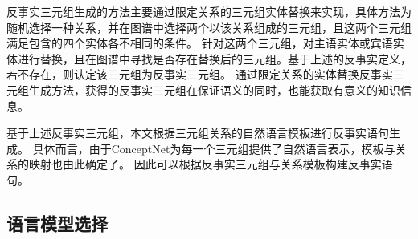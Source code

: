 反事实三元组生成的方法主要通过限定关系的三元组实体替换来实现，具体方法为随机选择一种关系，并在图谱中选择两个以该关系组成的三元组，且这两个三元组满足包含的四个实体各不相同的条件。
针对这两个三元组，对主语实体或宾语实体进行替换，且在图谱中寻找是否存在替换后的三元组。基于上述的反事实定义，若不存在，则认定该三元组为反事实三元组。
通过限定关系的实体替换反事实三元组生成方法，获得的反事实三元组在保证语义的同时，也能获取有意义的知识信息。

基于上述反事实三元组，本文根据三元组关系的自然语言模板进行反事实语句生成。
具体而言，由于ConceptNet为每一个三元组提供了自然语言表示，模板与关系的映射也由此确定了。
因此可以根据反事实三元组与关系模板构建反事实语句。

\subsection{语言模型选择}

